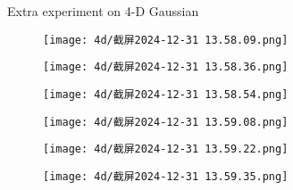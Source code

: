 \documentclass[final]{beamer}
\newlength{\sepwidth}
\newlength{\colwidth}
\newcommand{\separatorcolumn}{\begin{column}{\sepwidth}\end{column}}
\begin{document}
\begin{frame}[t]
\begin{columns}[t]
\begin{column}{\colwidth}
\begin{block}{Extra experiment on 4-D Gaussian}
    \begin{figure}
    \centering
    \begin{minipage}{0.49\textwidth}
    \centering
    \texttt{[image: 4d/截屏2024-12-31 13.58.09.png]}
    \end{minipage}
    \begin{minipage}{0.49\textwidth}
    \centering
    \centering
    \texttt{[image: 4d/截屏2024-12-31 13.58.36.png]}
    \end{minipage}
    \end{figure}

    \begin{figure}
    \centering
    \begin{minipage}{0.49\textwidth}
    \centering
    \texttt{[image: 4d/截屏2024-12-31 13.58.54.png]}
    \end{minipage}
    \begin{minipage}{0.49\textwidth}
    \centering
    \centering
    \texttt{[image: 4d/截屏2024-12-31 13.59.08.png]}
    \end{minipage}
    \end{figure}

    \begin{figure}
    \centering
    \begin{minipage}{0.49\textwidth}
    \centering
    \texttt{[image: 4d/截屏2024-12-31 13.59.22.png]}
    \end{minipage}
    \begin{minipage}{0.49\textwidth}
    \centering
    \centering
    \texttt{[image: 4d/截屏2024-12-31 13.59.35.png]}
    \end{minipage}
    \end{figure}
    
    \end{block}




\end{column}

\separatorcolumn
\end{columns}
\end{frame}
\end{document}
